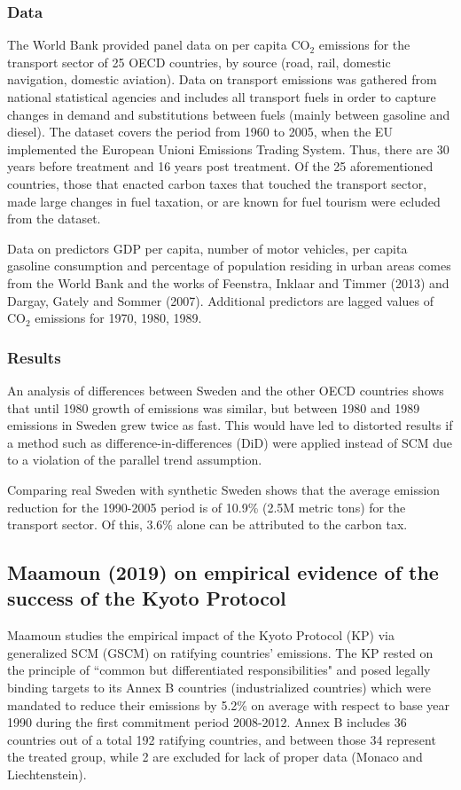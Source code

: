 \documentclass[12pt,a4paper,draft]{article}
\begin{document}
\subsubsection{Data}
The World Bank provided panel data on per capita CO$_2$ emissions for the transport sector 
of 25 OECD countries, by source (road, rail, domestic navigation, domestic aviation). 
Data on transport emissions was gathered from national statistical agencies and includes 
all transport fuels in order to capture changes in demand and substitutions between fuels 
(mainly between gasoline and diesel). The dataset covers the period from 1960 to 2005, when 
the EU implemented the European Unioni Emissions Trading System. 
Thus, there are 30 years before treatment and 16 years post treatment.
Of the 25 aforementioned countries, those that enacted carbon taxes that touched the 
transport sector, made large changes in fuel taxation, or are known for fuel tourism were 
ecluded from the dataset.

Data on predictors GDP per capita, number of motor vehicles, per capita gasoline consumption 
and percentage of population residing in urban areas comes from the World Bank and the works 
of Feenstra, Inklaar and Timmer (2013) and Dargay, Gately and Sommer (2007). Additional 
predictors are lagged values of CO$_2$ emissions for 1970, 1980, 1989.

\subsubsection{Results}
An analysis of differences between Sweden and the other OECD countries shows that 
until 1980 growth of emissions was similar, but between 1980 and 1989 emissions in Sweden 
grew twice as fast. This would have led to distorted results if a method such as 
difference-in-differences (DiD) were applied instead of SCM due to a violation of the 
parallel trend assumption.

Comparing real Sweden with synthetic Sweden shows that the average emission reduction for 
the 1990-2005 period is of 10.9\% (2.5M metric tons) for the transport sector. Of this, 
3.6\% alone can be attributed to the carbon tax.


\subsection{Maamoun (2019) on empirical evidence of the success of the Kyoto Protocol}
Maamoun studies the empirical impact of the Kyoto Protocol (KP) via generalized SCM (GSCM) 
on ratifying countries' emissions. 
The KP rested on the principle of ``common but differentiated responsibilities" and posed 
legally binding targets to its Annex B countries (industrialized countries) which were 
mandated to reduce their emissions by 5.2\% on average with respect to base year 1990 
during the first commitment period 2008-2012. 
Annex B includes 36 countries out of a total 192 ratifying countries, and between those 
34 represent the treated group, while 2 are excluded for lack of proper data (Monaco and 
Liechtenstein).
\end{document}
